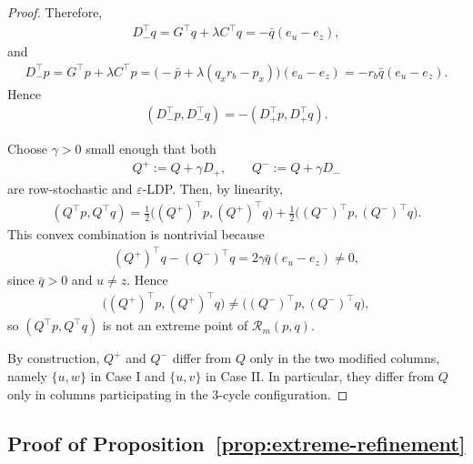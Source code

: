 \documentclass{article}
\theoremstyle{plain}
\theoremstyle{definition}
\theoremstyle{plain}
\begin{document}
\begin{proof}
Therefore,
\begin{align*}
    D_-^\top q=G^\top q+\lambda C^\top q=-\bar q(e_u-e_z),
\end{align*}
and
\begin{align*}
    D_-^\top p
    =
    G^\top p+\lambda C^\top p
    =
    \bigl(-\bar p+\lambda(q_xr_b-p_x)\bigr)(e_u-e_z)
    =
    -r_b\bar q(e_u-e_z).
\end{align*}
Hence
\begin{align*}
    (D_-^\top p,D_-^\top q)=-(D_+^\top p,D_+^\top q).
\end{align*}

Choose $\gamma>0$ small enough that both
\begin{align*}
    Q^+:=Q+\gamma D_+,
    \qquad
    Q^-:=Q+\gamma D_-
\end{align*}
are row-stochastic and $\varepsilon$-LDP. Then, by linearity,
\begin{align*}
    (Q^\top p,Q^\top q)
    =
    \frac12\bigl((Q^+)^\top p,(Q^+)^\top q\bigr)
    +
    \frac12\bigl((Q^-)^\top p,(Q^-)^\top q\bigr).
\end{align*}
This convex combination is nontrivial because
\begin{align*}
    (Q^+)^\top q-(Q^-)^\top q
    =
    2\gamma\bar q(e_u-e_z)\neq 0,
\end{align*}
since $\bar q>0$ and $u\neq z$. Hence
\begin{align*}
    \bigl((Q^+)^\top p,(Q^+)^\top q\bigr)
    \neq
    \bigl((Q^-)^\top p,(Q^-)^\top q\bigr),
\end{align*}
so $(Q^\top p,Q^\top q)$ is not an extreme point of $\mathcal R_m(p,q)$.

By construction, $Q^+$ and $Q^-$ differ from $Q$ only in the two modified columns, namely $\{u,w\}$ in Case I and $\{u,v\}$ in Case II. In particular, they differ from $Q$ only in columns participating in the $3$-cycle configuration.
\end{proof}



\subsection{Proof of Proposition~\ref{prop:extreme-refinement}}
\label{sec:proof-extreme-refinement}
\end{document}
